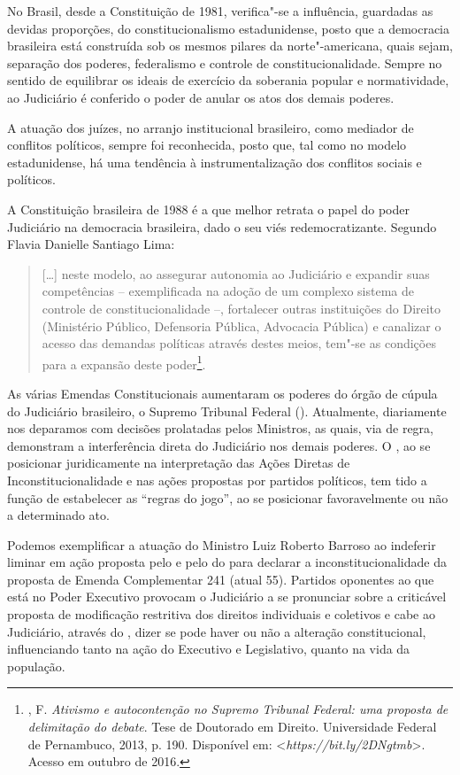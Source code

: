 No Brasil, desde a Constituição de 1981, verifica"-se a influência,
guardadas as devidas proporções, do constitucionalismo estadunidense,
posto que a democracia brasileira está construída sob os mesmos pilares
da norte"-americana, quais sejam, separação dos poderes, federalismo e
controle de constitucionalidade. Sempre no sentido de equilibrar os
ideais de exercício da soberania popular e normatividade, ao Judiciário
é conferido o poder de anular os atos dos demais poderes.

A atuação dos juízes, no arranjo institucional brasileiro, como mediador
de conflitos políticos, sempre foi reconhecida, posto que, tal como no
modelo estadunidense, há uma tendência à instrumentalização dos
conflitos sociais e políticos.

A Constituição brasileira de 1988 é a que melhor retrata o papel do
poder Judiciário na democracia brasileira, dado o seu viés
redemocratizante. Segundo Flavia Danielle Santiago Lima:

\begin{quote}
{[}\ldots{}{]} neste modelo, ao assegurar autonomia ao Judiciário e expandir
suas competências -- exemplificada na adoção de um complexo sistema de
controle de constitucionalidade --, fortalecer outras instituições do
Direito (Ministério Público, Defensoria Pública, Advocacia Pública) e
canalizar o acesso das demandas políticas através destes meios, tem"-se
as condições para a expansão deste poder\footnote{, F.
\emph{Ativismo e autocontenção no Supremo Tribunal Federal: uma
  proposta de delimitação do debate}. Tese de Doutorado em
  Direito. Universidade Federal de Pernambuco, 2013, p. 190. Disponível
  em: \textless{}\emph{https://bit.ly/2DNgtmb}\textgreater{}. Acesso em outubro de 2016.}.
\end{quote}

As várias Emendas Constitucionais aumentaram os poderes do órgão de
cúpula do Judiciário brasileiro, o Supremo Tribunal Federal ().
Atualmente, diariamente nos deparamos com decisões prolatadas pelos
Ministros, as quais, via de regra, demonstram a interferência direta do
Judiciário nos demais poderes. O , ao se posicionar juridicamente na
interpretação das Ações Diretas de Inconstitucionalidade e nas ações
propostas por partidos políticos, tem tido a função de estabelecer as
``regras do jogo'', ao se posicionar favoravelmente ou não a determinado
ato.

Podemos exemplificar a atuação do Ministro Luiz Roberto Barroso ao
indeferir liminar em ação proposta pelo  e pelo do para declarar
a inconstitucionalidade da proposta de Emenda Complementar 241 (atual
 55). Partidos oponentes ao que está no Poder Executivo provocam o
Judiciário a se pronunciar sobre a criticável proposta de modificação
restritiva dos direitos individuais e coletivos e cabe ao Judiciário,
através do , dizer se pode haver ou não a alteração constitucional,
influenciando tanto na ação do Executivo e Legislativo, quanto na vida
da população.

